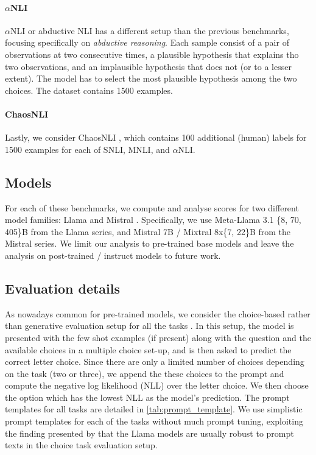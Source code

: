 \vspace{-1mm}
\paragraph{$\alpha$NLI}
$\alpha$NLI or abductive NLI \citep{bhagavatula2020abductive} has a different setup than the previous benchmarks, focusing specifically on \emph{abductive reasoning}.
Each sample consist of a pair of observations at two consecutive times, a plausible hypothesis that explains tho two observations, and an implausible hypothesis that does not (or to a lesser extent).
The model has to select the most plausible hypothesis among the two choices.
The dataset contains 1500 examples.

\vspace{-1mm}
\paragraph{ChaosNLI}
Lastly, we consider ChaosNLI \citep{nie-etal-2020-learn}, which contains 100 additional (human) labels for 1500 examples for each of SNLI, MNLI, and $\alpha$NLI.

\subsection{Models} For each of these benchmarks, we compute and analyse scores for two different model families: Llama \citep{dubey2024llama} and Mistral \citep{jiang2023mistral, jiang2024mixtral}. 
Specifically, we use Meta-Llama 3.1 \{8, 70, 405\}B from the Llama series, and Mistral 7B / Mixtral 8x\{7, 22\}B from the Mistral series.
We limit our analysis to pre-trained base models and leave the analysis on post-trained / instruct models to future work.

\subsection{Evaluation details}
As nowadays common for pre-trained models, we consider the choice-based rather than generative evaluation setup for all the tasks \citep{dubey2024llama,mmluhfleaderboard}. 
In this setup, the model is presented with the few shot examples (if present) along with the question and the available choices in a multiple choice set-up, and is then asked to predict the correct letter choice.
Since there are only a limited number of choices depending on the task (two or three), we append the these choices to the prompt and compute the negative log likelihood (NLL) over the letter choice. 
We then choose the option which has the lowest NLL as the model's prediction. 
The prompt templates for all tasks are detailed in \cref{tab:prompt_template}. 
We use simplistic prompt templates for each of the tasks without much prompt tuning, exploiting the finding presented by \citet{dubey2024llama} that the Llama models are usually robust to prompt texts in the choice task evaluation setup.
